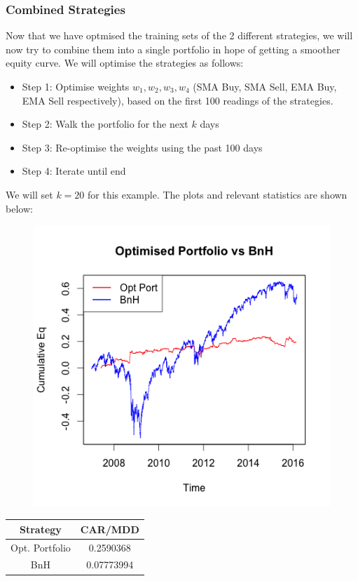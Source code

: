 \documentclass[12pt]{article}
\theoremstyle{definition}
\begin{document}
\subsubsection{Combined Strategies}
Now that we have optmised the training sets of the 2 different strategies, we will now try to combine them into a single portfolio in hope of getting a smoother equity curve. We will optimise the strategies as follows:
\begin{itemize}
\item Step 1: Optimise weights $w_1,w_2,w_3,w_4$ (SMA Buy, SMA Sell, EMA Buy, EMA Sell respectively), based on the first 100 readings of the strategies.
\item Step 2: Walk the portfolio for the next $k$ days
\item Step 3: Re-optimise the weights using the past 100 days
\item Step 4: Iterate until end
\end{itemize}
We will set $k=20$ for this example. The plots and relevant statistics are shown below:
\begin{figure}[H]
\centering
\includegraphics[scale=0.6]{last}
\end{figure}
\begin{table}[H]
\centering
\begin{tabular}{|c|c|}
\hline
Strategy & CAR/MDD\\
\hline
Opt. Portfolio & 0.2590368\\
BnH & 0.07773994\\
\hline
\end{tabular}
\end{table}
\newpage
\end{document}
